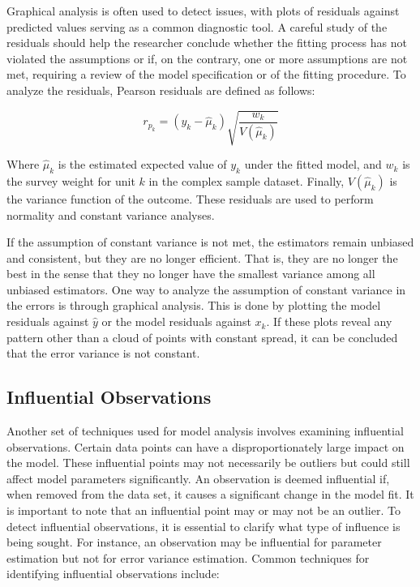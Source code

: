 \documentclass[
  12pt,
]{book}
\begin{document}
Graphical analysis is often used to detect issues, with plots of residuals against predicted values serving as a common diagnostic tool. A careful study of the residuals should help the researcher conclude whether the fitting process has not violated the assumptions or if, on the contrary, one or more assumptions are not met, requiring a review of the model specification or of the fitting procedure. To analyze the residuals, Pearson residuals \citep{Heeringa_West_Berglund_2017} are defined as follows:

\[
r_{p_{k}} = \left( y_{k} - \widehat \mu_{k} \right) \sqrt{\frac{w_{k}} {V\left(\hat{\mu}_{k}\right)}}
\]

Where \(\widehat \mu_{k}\) is the estimated expected value of \(y_{k}\) under the fitted model, and \(w_{k}\) is the survey weight for unit \(k\) in the complex sample dataset. Finally, \(V(\widehat \mu_{k})\) is the variance function of the outcome. These residuals are used to perform normality and constant variance analyses.

If the assumption of constant variance is not met, the estimators remain unbiased and consistent, but they are no longer efficient. That is, they are no longer the best in the sense that they no longer have the smallest variance among all unbiased estimators. One way to analyze the assumption of constant variance in the errors is through graphical analysis. This is done by plotting the model residuals against \(\widehat {y}\) or the model residuals against \(x_{k}\). If these plots reveal any pattern other than a cloud of points with constant spread, it can be concluded that the error variance is not constant.

\hypertarget{influential-observations}{%
\subsection{Influential Observations}\label{influential-observations}}

Another set of techniques used for model analysis involves examining influential observations. Certain data points can have a disproportionately large impact on the model. These influential points may not necessarily be outliers but could still affect model parameters significantly. An observation is deemed influential if, when removed from the data set, it causes a significant change in the model fit. It is important to note that an influential point may or may not be an outlier. To detect influential observations, it is essential to clarify what type of influence is being sought. For instance, an observation may be influential for parameter estimation but not for error variance estimation. Common techniques for identifying influential observations include:
\end{document}

